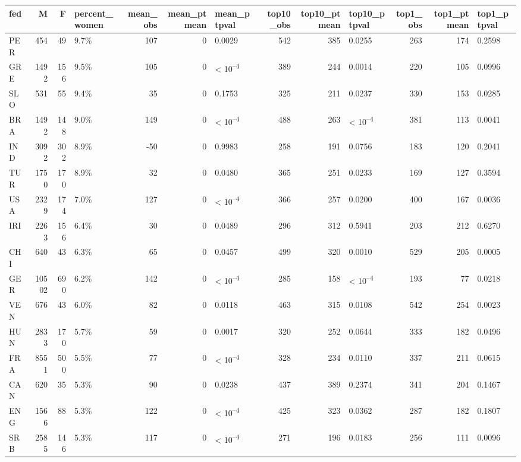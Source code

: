 
\begin{tabular}{l|r|r|l|r|r|l|r|r|l|r|r|l}
\hline
fed & M & F & percent_women & mean_obs & mean_ptmean & mean_ptpval & top10_obs & top10_ptmean & top10_ptpval & top1_obs & top1_ptmean & top1_ptpval\\
\hline
PER & 454 & 49 & 9.7\% & 107 & 0 & 0.0029 & 542 & 385 & 0.0255 & 263 & 174 & 0.2598\\
\hline
GRE & 1492 & 156 & 9.5\% & 105 & 0 & < 10\textsuperscript{--4} & 389 & 244 & 0.0014 & 220 & 105 & 0.0996\\
\hline
SLO & 531 & 55 & 9.4\% & 35 & 0 & 0.1753 & 325 & 211 & 0.0237 & 330 & 153 & 0.0285\\
\hline
BRA & 1492 & 148 & 9.0\% & 149 & 0 & < 10\textsuperscript{--4} & 488 & 263 & < 10\textsuperscript{--4} & 381 & 113 & 0.0041\\
\hline
IND & 3092 & 302 & 8.9\% & -50 & 0 & 0.9983 & 258 & 191 & 0.0756 & 183 & 120 & 0.2041\\
\hline
TUR & 1750 & 170 & 8.9\% & 32 & 0 & 0.0480 & 365 & 251 & 0.0233 & 169 & 127 & 0.3594\\
\hline
USA & 2329 & 174 & 7.0\% & 127 & 0 & < 10\textsuperscript{--4} & 366 & 257 & 0.0200 & 400 & 167 & 0.0036\\
\hline
IRI & 2263 & 156 & 6.4\% & 30 & 0 & 0.0489 & 296 & 312 & 0.5941 & 203 & 212 & 0.6270\\
\hline
CHI & 640 & 43 & 6.3\% & 65 & 0 & 0.0457 & 499 & 320 & 0.0010 & 529 & 205 & 0.0005\\
\hline
GER & 10502 & 690 & 6.2\% & 142 & 0 & < 10\textsuperscript{--4} & 285 & 158 & < 10\textsuperscript{--4} & 193 & 77 & 0.0218\\
\hline
VEN & 676 & 43 & 6.0\% & 82 & 0 & 0.0118 & 463 & 315 & 0.0108 & 542 & 254 & 0.0023\\
\hline
HUN & 2833 & 170 & 5.7\% & 59 & 0 & 0.0017 & 320 & 252 & 0.0644 & 333 & 182 & 0.0496\\
\hline
FRA & 8551 & 500 & 5.5\% & 77 & 0 & < 10\textsuperscript{--4} & 328 & 234 & 0.0110 & 337 & 211 & 0.0615\\
\hline
CAN & 620 & 35 & 5.3\% & 90 & 0 & 0.0238 & 437 & 389 & 0.2374 & 341 & 204 & 0.1467\\
\hline
ENG & 1566 & 88 & 5.3\% & 122 & 0 & < 10\textsuperscript{--4} & 425 & 323 & 0.0362 & 287 & 182 & 0.1807\\
\hline
SRB & 2585 & 146 & 5.3\% & 117 & 0 & < 10\textsuperscript{--4} & 271 & 196 & 0.0183 & 256 & 111 & 0.0096\\
\hline

\end{tabular}

